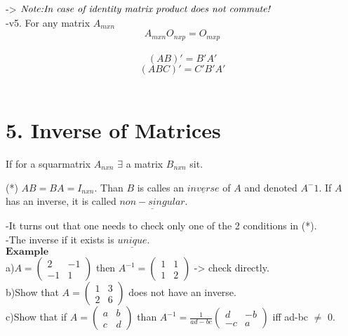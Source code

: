 \documentclass[]{article}
\begin{document}
-\textgreater{}
\(\text{\textit{Note:In case of identity matrix product does not commute!}}\)\\

-v5. For any matrix \(A_{mxn}\)\\
 \[A_{mxn}O_{nxp}=O_{mxp}\]\\
 \[(AB)'=B'A'\] \[(ABC)'=C'B'A'\]\\

\section{\texorpdfstring{5. Inverse of Matrices\\
}{5. Inverse of Matrices }}\label{inverse-of-matrices}

\begin{tcolorbox}[colback=green!5,colframe=red!40!black,title=Definition]
  If for a squarmatrix $A_{nxn}$ $\exists$  a matrix $B_{nxn}$ sit.\
  
  (*) $AB = BA = I_{nxn}$.  Than $B$ is calles an $\underline{inverse}$ of $A$ and denoted $A^-1$. If $A$ has an inverse, it is called $\underline{non-singular}$.
  

\end{tcolorbox}

-It turns out that one needs to check only one of the 2 conditions in
(*).\\[2\baselineskip] -The inverse if it exists is
\(\underline{unique}\).\\

\(\mathbf{Example}\)\\
 a)\(A=\begin{pmatrix} 2 & -1 \\ -1 & 1 \end{pmatrix}\) then
\(A^{-1}=\begin{pmatrix} 1 & 1 \\ 1 & 2 \end{pmatrix}\) -\textgreater{}
check directly.\\

b)Show that \(A=\begin{pmatrix} 1 & 3 \\ 2 & 6 \end{pmatrix}\) does not
have an inverse.\\

c)Show that if \(A=\begin{pmatrix} a & b \\ c & d \end{pmatrix}\) than
\(A^{-1} =\frac{1}{ad-bc}\begin{pmatrix} d & -b \\ -c & a \end{pmatrix}\)
iff ad-bc \(\neq\) 0.\\
\end{document}
